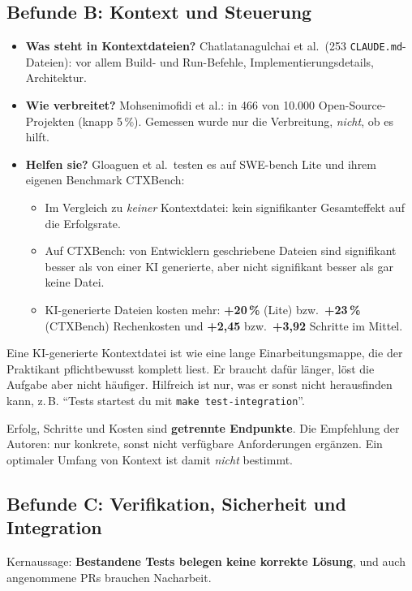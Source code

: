\documentclass[11pt,a4paper,parskip=half]{scrartcl}
\begin{document}
\subsection{Befunde B: Kontext und Steuerung}
\begin{itemize}
\item \textbf{Was steht in Kontextdateien?} Chatlatanagulchai et al.\ (253 \texttt{CLAUDE.md}-Dateien): vor allem Build- und Run-Befehle, Implementierungsdetails, Architektur.
\item \textbf{Wie verbreitet?} Mohsenimofidi et al.: in 466 von 10.000 Open-Source-Projekten (knapp 5\,\%). Gemessen wurde nur die Verbreitung, \emph{nicht}, ob es hilft.
\item \textbf{Helfen sie?} Gloaguen et al.\ testen es auf SWE-bench Lite und ihrem eigenen Benchmark CTXBench:
  \begin{itemize}
  \item Im Vergleich zu \emph{keiner} Kontextdatei: kein signifikanter Gesamteffekt auf die Erfolgsrate.
  \item Auf CTXBench: von Entwicklern geschriebene Dateien sind signifikant besser als von einer KI generierte, aber nicht signifikant besser als gar keine Datei.
  \item KI-generierte Dateien kosten mehr: \textbf{+20\,\%} (Lite) bzw.\ \textbf{+23\,\%} (CTXBench) Rechenkosten und \textbf{+2,45} bzw.\ \textbf{+3,92} Schritte im Mittel.
  \end{itemize}
\end{itemize}

\begin{beispiel}
Eine KI-generierte Kontextdatei ist wie eine lange Einarbeitungsmappe, die der Praktikant pflichtbewusst komplett liest. Er braucht dafür länger, löst die Aufgabe aber nicht häufiger. Hilfreich ist nur, was er sonst nicht herausfinden kann, z.\,B. \enquote{Tests startest du mit \texttt{make test-integration}}.
\end{beispiel}

\begin{merke}
Erfolg, Schritte und Kosten sind \textbf{getrennte Endpunkte}. Die Empfehlung der Autoren: nur konkrete, sonst nicht verfügbare Anforderungen ergänzen. Ein optimaler Umfang von Kontext ist damit \emph{nicht} bestimmt.
\end{merke}

\subsection{Befunde C: Verifikation, Sicherheit und Integration}\label{sec:verifikation}
Kernaussage: \textbf{Bestandene Tests belegen keine korrekte Lösung}, und auch angenommene PRs brauchen Nacharbeit.
\end{document}
